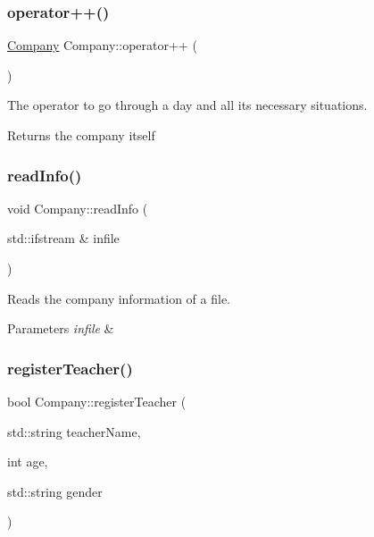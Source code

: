 \subsubsection{\texorpdfstring{operator++()}{operator++()}}
{\footnotesize\ttfamily \mbox{\hyperlink{class_company}{Company}} Company\+::operator++ (\begin{DoxyParamCaption}{ }\end{DoxyParamCaption})}



The operator to go through a day and all its necessary situations. 

\begin{DoxyReturn}{Returns}
the company itself 
\end{DoxyReturn}
\mbox{\label{class_company_a2b97cd4ed80ecab0aa92d0f9c1f81071}} 
\subsubsection{\texorpdfstring{read\+Info()}{readInfo()}}
{\footnotesize\ttfamily void Company\+::read\+Info (\begin{DoxyParamCaption}\item[{std\+::ifstream \&}]{infile }\end{DoxyParamCaption})}



Reads the company information of a file. 


\begin{DoxyParams}{Parameters}
{\em infile} & \\
\hline
\end{DoxyParams}
\mbox{\label{class_company_afd7f0c326672c6bb6a23d5921503bc0d}} 
\subsubsection{\texorpdfstring{register\+Teacher()}{registerTeacher()}}
{\footnotesize\ttfamily bool Company\+::register\+Teacher (\begin{DoxyParamCaption}\item[{std\+::string}]{teacher\+Name,  }\item[{int}]{age,  }\item[{std\+::string}]{gender }\end{DoxyParamCaption})}




